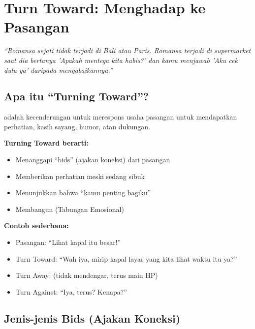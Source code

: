 \chapter{Turn Toward: Menghadap ke Pasangan}

\begin{insightbox}
\textit{``Romansa sejati tidak terjadi di Bali atau Paris. Romansa terjadi di supermarket saat dia bertanya 'Apakah mentega kita habis?' dan kamu menjawab 'Aku cek dulu ya' daripada mengabaikannya.''}
\end{insightbox}

\section{Apa itu ``Turning Toward''?}

 adalah kecenderungan untuk merespons usaha pasangan untuk mendapatkan perhatian, kasih sayang, humor, atau dukungan.

\begin{praktikbox}
\textbf{Turning Toward berarti:}
\begin{itemize}
    \item Menanggapi ``bids'' (ajakan koneksi) dari pasangan
    \item Memberikan perhatian meski sedang sibuk
    \item Menunjukkan bahwa ``kamu penting bagiku''
    \item Membangun  (Tabungan Emosional)
\end{itemize}

\textbf{Contoh sederhana:}
\begin{itemize}
    \item Pasangan: ``Lihat kapal itu besar!''
    \item Turn Toward: ``Wah iya, mirip kapal layar yang kita lihat waktu itu ya?''
    \item Turn Away: (tidak mendengar, terus main HP)
    \item Turn Against: ``Iya, terus? Kenapa?''
\end{itemize}
\end{praktikbox}

\section{Jenis-jenis Bids (Ajakan Koneksi)}


